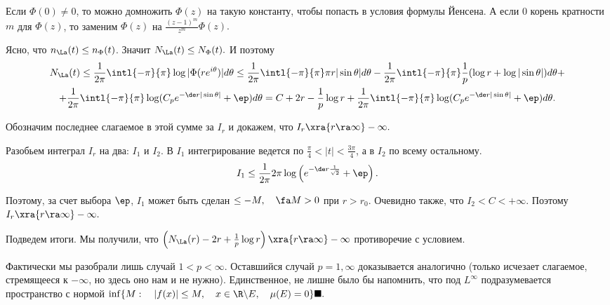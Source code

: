 \documentclass[a4paper]{article}
\begin{document}
Если $\Phi(0)\neq0$, то можно домножить $\Phi(z)$ на такую
константу, чтобы попасть в условия формулы Йенсена. А если $0$ корень кратности $m$ для $\Phi(z)$, то заменим $\Phi(z)$ на
$\frac{(z-1)^m}{z^m}\Phi(z).$

Ясно, что $n_{\La}(t)\le n_{\Phi}(t)$. Значит
$N_{\La}(t)\le N_{\Phi}(t).$ И поэтому
\begin{multline*}
N_{\La}(t)\le\frac1{2\pi}\intl{-\pi}{\pi}\log|\Phi(re^{i\theta})|d\theta\le
\frac1{2\pi}\intl{-\pi}{\pi}\pi
r|\sin\theta|d\theta-\frac1{2\pi}\intl{-\pi}{\pi}\frac1p(\log
r+\log|\sin\theta|)d\theta+\\
+\frac1{2\pi}\intl{-\pi}{\pi}\log(C_pe^{-\de
r|\sin\theta|}+\ep)d\theta=C+2r-\frac1p\log
r+\frac1{2\pi}\intl{-\pi}{\pi}\log(C_pe^{-\de
r|\sin\theta|}+\ep)d\theta.
\end{multline*}

Обозначим последнее слагаемое в этой сумме за $I_r$ и докажем, что
$I_r\xra{r\ra\infty} -\infty.$

Разобьем интеграл $I_r$ на два: $I_1$ и $I_2$. В $I_1$
интегрирование ведется по $\frac{\pi}4<|t|<\frac{3\pi}4$, а в
$I_2$ по всему остальному.
$$I_1\le\frac1{2\pi}2\pi\log\left(e^{-\de
r\frac1{\sqrt{2}}}+\ep\right).$$

Поэтому, за счет выбора $\ep$, $I_1$ может быть сделан
$\le-M,\quad\fa M>0$ при $r>r_0$. Очевидно также, что
$I_2<C<+\infty.$ Поэтому $I_r\xra{r\ra\infty}
-\infty.$

Подведем итоги. Мы получили, что $\left(N_{\La}(r)-2r+\frac1p
\log r\right)\xra{r\ra\infty}-\infty$ противоречие с условием.

Фактически мы разобрали лишь случай $1<p<\infty.$ Оставшийся
случай $p=1,\infty$ доказывается аналогично (только исчезает
слагаемое, стремящееся к $-\infty$, но здесь оно нам и не нужно).
Единственное, не лишне было бы напомнить, что под $L^{\infty}$
подразумевается пространство с нормой $\inf\{M:\quad|f(x)|\le
M,\quad x\in\R \backslash E,\quad\mu(E)=0\}\blacksquare.$
\end{document}
